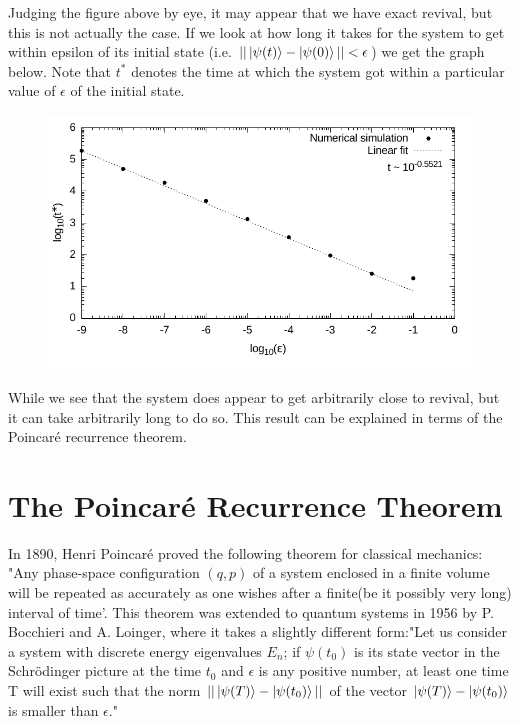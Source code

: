 \documentclass[a4paper,10pt]{article}
\begin{document}
Judging the figure above by eye, it may appear that we have exact revival, but this is not actually the case. If we look at how long it takes for the system to get within epsilon of
its initial state (i.e. $||\ket{\psi(t)}-\ket{\psi(0)}||<\epsilon$)
we get the graph below. Note that $t^*$ denotes the time at which the system got within a particular value of $\epsilon$ of the initial state.
\begin{figure}[H]
 \includegraphics[width=1.0\textwidth]{recurrence_times}
 \centering
\end{figure}
While we see that the system does appear to get arbitrarily close to revival, but it can take arbitrarily long to do so. This result can be explained in terms of the Poincar\'e recurrence theorem.
\newpage
\section{The Poincar\'e Recurrence Theorem}

In 1890, Henri Poincar\'e proved the following theorem for classical mechanics: "Any phase-space configuration $(q,p)$ of a system enclosed in a finite volume will be repeated as accurately as one wishes
after a finite(be it possibly very long) interval of time'. This theorem was extended to quantum systems in 1956 by P. Bocchieri and A. Loinger\cite{Bocchieri1957}, where it takes a slightly different
form:"Let us consider a system with discrete energy eigenvalues $E_n$; if $\psi(t_0)$ is its state vector in the Schr{\"o}dinger picture at the time $t_0$ and $\epsilon$ is any positive number, at 
least one time T will exist such that the norm $||\ket{\psi(T)}-\ket{\psi(t_0)}||$ of the vector $\ket{\psi(T)}-\ket{\psi(t_{0})}$ is smaller than $\epsilon$."
\end{document}
